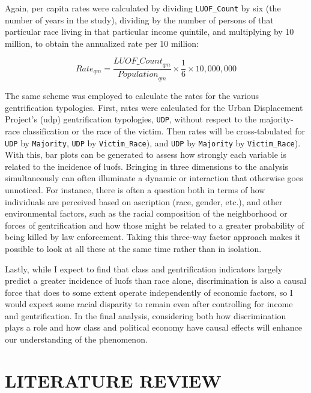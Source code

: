 \documentclass[12pt]{article}
\begin{document}
Again, per capita rates were calculated by dividing \texttt{LUOF\_Count} by six (the number of years in the study), dividing by the number of persons of that particular race living in that particular income quintile, and multiplying by 10 million, to obtain the annualized rate per 10 million:

\begin{equation}
{Rate}_{qm}=\frac{{LUOF\_Count}_{qm}}{{Population}_{qm}}\times\frac{1}{6}\times10,000,000
\label{eq:quintile_majority_rate}
\end{equation}

The same scheme was employed to calculate the rates for the various gentrification typologies. First, rates were calculated for the Urban Displacement Project’s (\acrshort{udp}) gentrification typologies, \texttt{UDP}, without respect to the majority-race classification or the race of the victim. Then rates will be cross-tabulated for \texttt{UDP} by \texttt{Majority}, \texttt{UDP} by \texttt{Victim\_Race}), and \texttt{UDP} by \texttt{Majority} by \texttt{Victim\_Race}). With this, bar plots can be generated to assess how strongly each variable is related to the incidence of \acrshort{luof}s. Bringing in three dimensions to the analysis simultaneously can often illuminate a dynamic or interaction that otherwise goes unnoticed. For instance, there is often a question both in terms of how individuals are perceived based on ascription (race, gender, etc.), and other environmental factors, such as the racial composition of the neighborhood or forces of gentrification and how those might be related to a greater probability of being killed by law enforcement. Taking this three-way factor approach makes it possible to look at all these at the same time rather than in isolation.

Lastly, while I expect to find that class and gentrification indicators largely predict a greater incidence of \acrshort{luof}s than race alone, discrimination is also a causal force that does to some extent operate independently of economic factors, so I would expect some racial disparity to remain even after controlling for income and gentrification. In the final analysis, considering both how discrimination plays a role and how class and political economy have causal effects will enhance our understanding of the phenomenon.

\section{LITERATURE REVIEW}\
\end{document}
